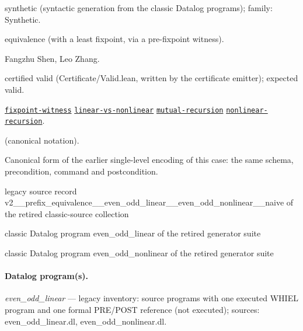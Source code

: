 \documentclass[10pt]{article}
\begin{document}
\begin{description}[leftmargin=2.6cm,style=nextline,itemsep=1pt]

\item[Category] synthetic (syntactic generation from the classic Datalog programs); family: Synthetic.

\item[Kind] equivalence (with a least fixpoint, via a pre-fixpoint witness).

\item[Contributors] Fangzhu Shen, Leo Zhang.

\item[Status] certified valid (Certificate/Valid.lean, written by the certificate emitter); expected valid.

\item[Tags] \hyperref[tag:fixpoint-witness]{\texttt{fixpoint-witness}} \hyperref[tag:linear-vs-nonlinear]{\texttt{linear-vs-nonlinear}} \hyperref[tag:mutual-recursion]{\texttt{mutual-recursion}} \hyperref[tag:nonlinear-recursion]{\texttt{nonlinear-recursion}}.

\item[Input]  (canonical notation).

\item[Summary] Canonical form of the earlier single-level encoding of this case: the same schema, precondition, command and postcondition.

\item[Sources] {\raggedright legacy source record v2\_\_prefix\_equivalence\_\_even\_odd\_linear\_\_even\_odd\_nonlinear\_\_naive of the retired classic-source collection \par classic Datalog program even\_odd\_linear of the retired generator suite \par classic Datalog program even\_odd\_nonlinear of the retired generator suite\par}

\end{description}

\paragraph{Datalog program(s).}

{\raggedright\textit{even\_odd\_linear} --- legacy inventory: source programs with one executed WHIEL program and one formal PRE/POST reference (not executed); sources: even\_odd\_linear.dl, even\_odd\_nonlinear.dl.\par}
\end{document}
